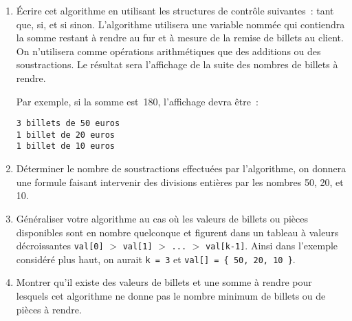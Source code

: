 \documentclass[10pt,a4paper]{article}
\begin{document}
\begin{enumerate}
\item Écrire cet algorithme en utilisant les structures de contrôle suivantes~: tant que, si, et si sinon. L'algorithme utilisera une variable nommée qui contiendra la somme restant à rendre au fur et à mesure de la remise de billets au client. On n'utilisera comme opérations arithmétiques que des additions ou des soustractions. Le résultat sera l'affichage de la suite des nombres de billets à rendre.

Par exemple, si la somme est~180, l'affichage devra être~:

\begin{verbatim}
3 billets de 50 euros
1 billet de 20 euros
1 billet de 10 euros
\end{verbatim}


\item Déterminer le nombre de soustractions effectuées par l'algorithme, on donnera une formule faisant intervenir des divisions entières par les nombres 50, 20, et 10.



\item Généraliser votre algorithme au cas où les valeurs de billets ou pièces disponibles sont en nombre quelconque et figurent dans un tableau à valeurs décroissantes \verb:val[0]: $>$ \verb:val[1]: $>$ \verb:...: $>$ \verb:val[k-1]:. Ainsi dans l'exemple considéré plus haut, on aurait \verb:k = 3: et \verb:val[] = { 50, 20, 10 }:.



\item Montrer qu'il existe des valeurs de billets et une somme à rendre pour lesquels cet algorithme ne donne pas le nombre minimum de billets ou de pièces à rendre.



\end{enumerate}
\end{document}

